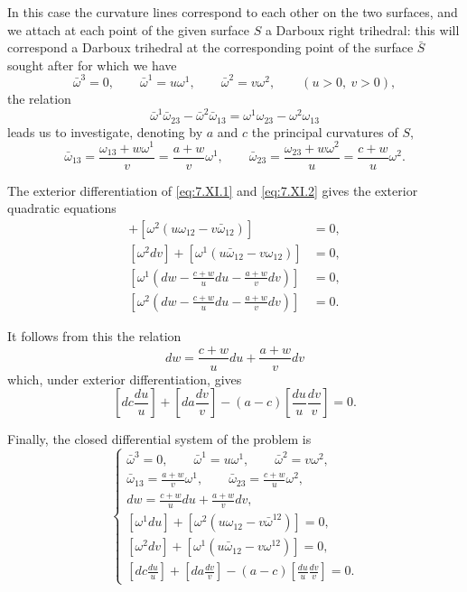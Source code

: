 \documentclass[leqno,11pt]{book}
\numberwithin{equation}{chapter}
\theoremstyle{shape1}
\theoremstyle{shape0}
\theoremstyle{shape2}
\theoremstyle{definition}
\begin{document}
\fsec In this case the curvature lines  correspond to each other on the two surfaces, and we attach at each point of the given surface $S$ a Darboux right trihedral: this will correspond a Darboux trihedral at the corresponding point of the surface $\bar S$ sought after for which we have
\begin{equation}
  \label{eq:7.XI.1}\tag{XI, 1}
  \bar\omega^{3}=0,\qquad\bar\omega^{1}=u\omega^{1},\qquad\bar\omega^{2}=v\omega^{2},\qquad(u>0,\ v>0),
\end{equation}
the relation
\[
\bar\omega^{1}\bar\omega_{23}-\bar\omega^{2}\bar\omega_{13}=\omega^{1}\omega_{23}-\omega^{2}\omega_{13}
\]
leads us to investigate, denoting by $a$ and $c$ the principal curvatures of $S$,
\begin{equation}
  \label{eq:7.XI.2}\tag{XI, 2}
  \bar\omega_{13}=\frac{\omega_{13}+w\omega^{1}}{v}=\frac{a+w}{v}\omega^{1},\qquad\bar\omega_{23}=\frac{\omega_{23}+w\omega^{2}}{u}=\frac{c+w}{u}\omega^{2}.
\end{equation}

The exterior differentiation of \eqref{eq:7.XI.1} and \eqref{eq:7.XI.2} gives the exterior quadratic equations
\begin{align*}
  [\omega^{1}du]+[\omega^{2}(u\omega_{12}-v\bar\omega_{12})]&=0,\\
  [\omega^{2}dv]+[\omega^{1}(u\bar\omega_{12}-v\omega_{12})]&=0,\\
  \left[\omega^{1}\left(dw-\frac{c+w}{u}du-\frac{a+w}{v}dv\right)\right]&=0,\\
  \left[\omega^{2}\left(dw-\frac{c+w}{u}du-\frac{a+w}{v}dv\right)\right]&=0.
\end{align*}

It follows from this the relation
\[
dw=\frac{c+w}{u}du+\frac{a+w}{v}dv
\]
which, under exterior differentiation, gives
\[
\left[dc\frac{du}{u}\right]+\left[da\frac{dv}{v}\right]-(a-c)\left[\frac{du}{u}\frac{dv}{v}\right]=0.
\]

Finally, the closed differential system of the problem is
\begin{equation}
  \label{eq:7.XI.3}\tag{XI, 3}
  \left\{
    \begin{gathered}
      \bar\omega^{3}=0,\qquad\bar\omega^{1}=u\omega^{1},\qquad\bar\omega^{2}=v\omega^{2},\\
      \bar\omega_{13}=\frac{a+w}{v}\omega^{1},\qquad\bar\omega_{23}=\frac{c+w}{u}\omega^{2},\\
      dw=\frac{c+w}{u}du+\frac{a+w}{v}dv,\\
      [\omega^{1}du]+[\omega^{2}(u\omega_{12}-v\bar\omega^{12})]=0,\\
      [\omega^{2}dv]+[\omega^{1}(u\bar\omega_{12}-v\omega^{12})]=0,\\
      \left[dc\frac{du}{u}\right]+\left[da\frac{dv}{v}\right]-(a-c)\left[\frac{du}{u}\frac{dv}{v}\right]=0.
    \end{gathered}
  \right.
\end{equation}
\end{document}
